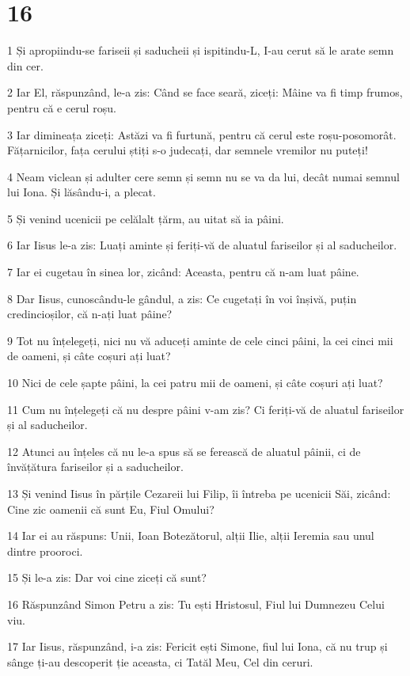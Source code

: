 \chapter{16}

\par 1 Și apropiindu-se fariseii și saducheii și ispitindu-L, I-au cerut să le arate semn din cer.
\par 2 Iar El, răspunzând, le-a zis: Când se face seară, ziceți: Mâine va fi timp frumos, pentru că e cerul roșu.
\par 3 Iar dimineața ziceți: Astăzi va fi furtună, pentru că cerul este roșu-posomorât. Fățarnicilor, fața cerului știți s-o judecați, dar semnele vremilor nu puteți!
\par 4 Neam viclean și adulter cere semn și semn nu se va da lui, decât numai semnul lui Iona. Și lăsându-i, a plecat.
\par 5 Și venind ucenicii pe celălalt țărm, au uitat să ia pâini.
\par 6 Iar Iisus le-a zis: Luați aminte și feriți-vă de aluatul fariseilor și al saducheilor.
\par 7 Iar ei cugetau în sinea lor, zicând: Aceasta, pentru că n-am luat pâine.
\par 8 Dar Iisus, cunoscându-le gândul, a zis: Ce cugetați în voi înșivă, puțin credincioșilor, că n-ați luat pâine?
\par 9 Tot nu înțelegeți, nici nu vă aduceți aminte de cele cinci pâini, la cei cinci mii de oameni, și câte coșuri ați luat?
\par 10 Nici de cele șapte pâini, la cei patru mii de oameni, și câte coșuri ați luat?
\par 11 Cum nu înțelegeți că nu despre pâini v-am zis? Ci feriți-vă de aluatul fariseilor și al saducheilor.
\par 12 Atunci au înțeles că nu le-a spus să se ferească de aluatul pâinii, ci de învățătura fariseilor și a saducheilor.
\par 13 Și venind Iisus în părțile Cezareii lui Filip, îi întreba pe ucenicii Săi, zicând: Cine zic oamenii că sunt Eu, Fiul Omului?
\par 14 Iar ei au răspuns: Unii, Ioan Botezătorul, alții Ilie, alții Ieremia sau unul dintre prooroci.
\par 15 Și le-a zis: Dar voi cine ziceți că sunt?
\par 16 Răspunzând Simon Petru a zis: Tu ești Hristosul, Fiul lui Dumnezeu Celui viu.
\par 17 Iar Iisus, răspunzând, i-a zis: Fericit ești Simone, fiul lui Iona, că nu trup și sânge ți-au descoperit ție aceasta, ci Tatăl Meu, Cel din ceruri.

